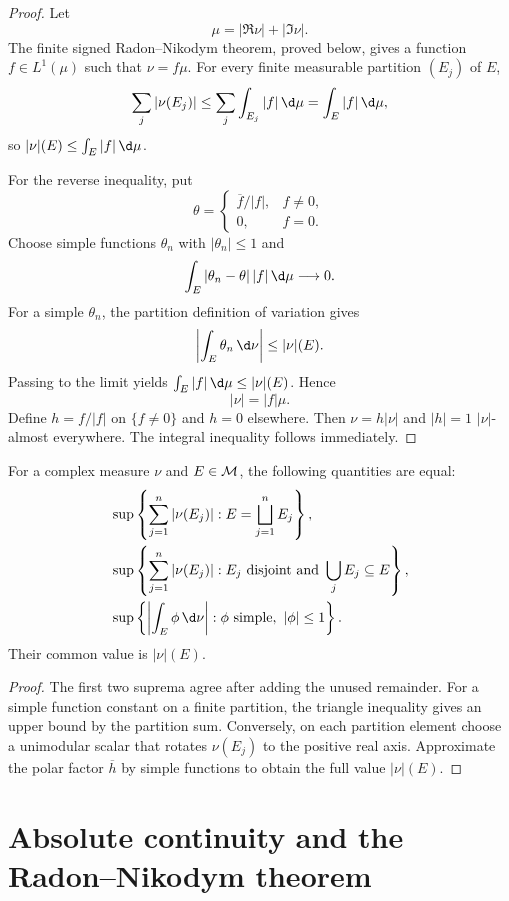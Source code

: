 \begin{proof}
Let
\[
\mu=|\Re\nu|+|\Im\nu|.
\]
The finite signed Radon--Nikodym theorem, proved below, gives a function $f\in L^1(\mu)$ such that $\nu=f\mu$. For every finite measurable partition $(E_j)$ of $E$,
\[
\sum_j|\nu(E_j)|
\leq\sum_j\int_{E_j}|f|\,\d\mu
=\int_E|f|\,\d\mu,
\]
so $|\nu|(E)\leq\int_E|f|\,\d\mu$.

For the reverse inequality, put
\[
\theta=\begin{cases}\overline f/|f|,&f\neq0,\\0,&f=0.\end{cases}
\]
Choose simple functions $\theta_n$ with $|\theta_n|\leq1$ and
\[
\int_E|\theta_n-\theta|\,|f|\,\d\mu\longrightarrow0.
\]
For a simple $\theta_n$, the partition definition of variation gives
\[
\left|\int_E\theta_n\,\d\nu\right|\leq|\nu|(E).
\]
Passing to the limit yields $\int_E|f|\,\d\mu\leq|\nu|(E)$. Hence
\[
|\nu|=|f|\mu.
\]
Define $h=f/|f|$ on $\{f\neq0\}$ and $h=0$ elsewhere. Then $\nu=h|\nu|$ and $|h|=1$ $|\nu|$-almost everywhere. The integral inequality follows immediately.
\end{proof}

\begin{prop}
For a complex measure $\nu$ and $E\in\mathcal{M}$, the following quantities are equal:
\begin{align*}
&\sup\left\{\sum_{j=1}^n|\nu(E_j)|:E=\bigsqcup_{j=1}^nE_j\right\},\\
&\sup\left\{\sum_{j=1}^n|\nu(E_j)|:E_j\text{ disjoint and }\bigcup_jE_j\subseteq E\right\},\\
&\sup\left\{\left|\int_E\phi\,\d\nu\right|:\phi\text{ simple},\ |\phi|\leq1\right\}.
\end{align*}
Their common value is $|\nu|(E)$.
\end{prop}

\begin{proof}
The first two suprema agree after adding the unused remainder. For a simple function constant on a finite partition, the triangle inequality gives an upper bound by the partition sum. Conversely, on each partition element choose a unimodular scalar that rotates $\nu(E_j)$ to the positive real axis. Approximate the polar factor $\overline h$ by simple functions to obtain the full value $|\nu|(E)$.
\end{proof}

\section{Absolute continuity and the Radon--Nikodym theorem}

